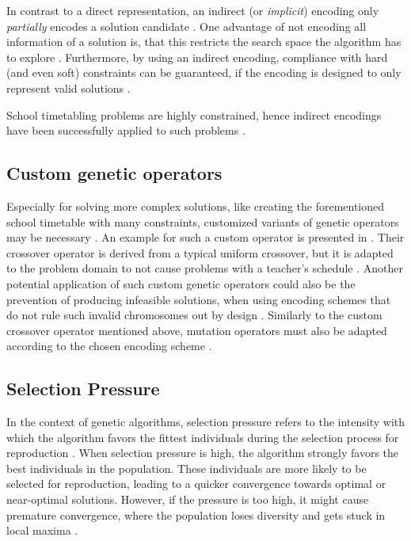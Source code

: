 \documentclass[sigconf]{acmart}
\begin{document}
In contrast to a direct representation, an indirect (or \textit{implicit})
encoding only \textit{partially} encodes a solution candidate \cite{Thanh2007}.
One advantage of not encoding all information of a solution is, that
this restricts the search space the algorithm has to explore \cite{Goos2002}.
Furthermore, by using an indirect encoding, compliance with hard (and even
soft) constraints can be guaranteed, if the encoding is designed to
only represent valid solutions \cite{Goos2002}.

School timetabling problems are highly constrained, hence indirect
encodings have been successfully applied to such problems \cite{Goos2002}.


\subsection{Custom genetic operators}
Especially for solving more complex solutions, like creating the forementioned
school timetable with many constraints, customized variants of genetic
operators may be necessary \cite{Beligiannis2009,Almeida2015}.
An example for such a custom operator is presented in \cite{Beligiannis2009}.
Their crossover operator is derived from a typical uniform crossover, but
it is adapted to the problem domain to not cause problems with a teacher's
schedule \cite{Beligiannis2009}.
Another potential application of such custom genetic operators could also be
the prevention of producing infeasible solutions, when using encoding schemes
that do not rule such invalid chromosomes out by design \cite{Elliman1995}.
%
Similarly to the custom crossover operator mentioned above,
mutation operators must also be adapted according to the chosen encoding
scheme \cite{Almeida2015}.



\subsection{Selection Pressure}
In the context of genetic algorithms, selection pressure refers to the
intensity with which the algorithm favors the fittest individuals during the
selection process for reproduction \cite{back1994selective, Affenzeller2009}.
%
When selection pressure is high, the algorithm strongly favors the best
individuals in the population. These individuals are more likely to be selected
for reproduction, leading to a quicker convergence towards optimal or
near-optimal solutions. However, if the pressure is too high, it might cause
premature convergence, where the population loses diversity and gets stuck in
local maxima \cite{back1994selective}.
\end{document}

